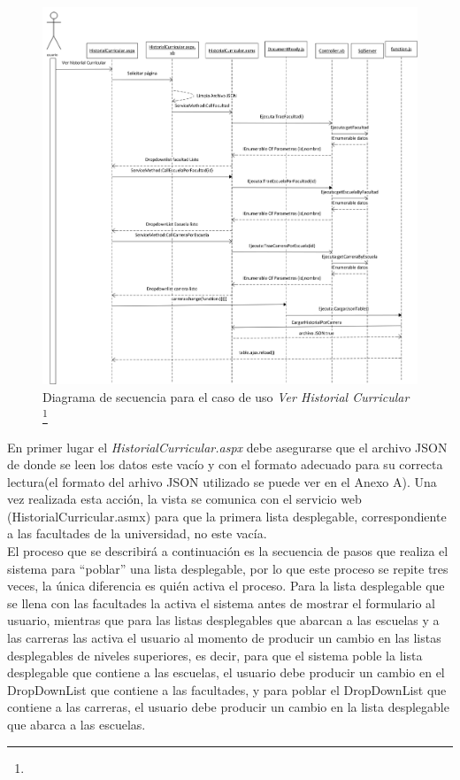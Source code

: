 			\begin{figure}[H]
				\centering
				\includegraphics[width=1\textwidth]{images/Capitulo_3/diagrama_secuencial_Historial_Curricular.png}
				\caption[Diagrama de secuencia para el caso de uso \textit{Ver Historial Curricular}]{Diagrama de secuencia para el caso de uso \textit{Ver Historial Curricular} \footnote{}}
				\label{diagrama_secuencial_ver_historial}
			\end{figure}

		
		 En primer lugar el \textit{HistorialCurricular.aspx}  debe asegurarse que el archivo JSON de donde se leen los datos este vacío y con el formato adecuado para su correcta lectura(el formato del arhivo JSON utilizado se puede ver en el Anexo A). Una vez realizada esta acción, la vista se comunica con el servicio web (HistorialCurricular.asmx) para que la primera lista desplegable, correspondiente a las facultades  de la universidad,  no este vacía.\\
		 
		  El proceso que se describirá a continuación es la secuencia de pasos que realiza el sistema para  ``poblar'' una lista desplegable, por lo que este proceso se repite tres veces, la única diferencia es quién activa el proceso. Para la lista desplegable que se llena con las facultades la activa el sistema antes de mostrar el formulario al usuario, mientras que para las listas desplegables que abarcan a las escuelas y a las carreras las activa el usuario al momento de producir un cambio en las listas desplegables de niveles superiores, es decir, 
		  para que  el sistema poble la lista desplegable que contiene a las escuelas, el usuario debe producir un cambio en el DropDownList que contiene a  las facultades, y para poblar el DropDownList que contiene a las carreras, el usuario debe producir un cambio en la lista desplegable que abarca a las escuelas.\\

